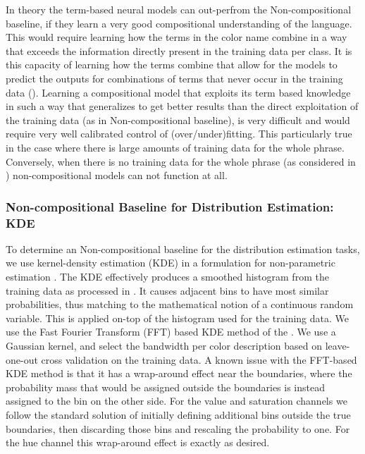 \documentclass[]{clv3}
\newcommand{\parencite}{\citep}
\newcommand{\textcite}{\citet}
\newcommand{\empmodel}{Non-compositional baseline}
\begin{document}
In theory the term-based neural models can out-perfrom the \empmodel{}, if they learn a very good compositional understanding of the language.
This would require learning how the terms in the color name combine in a way that exceeds the information directly present in the training data per class.
It is this capacity of learning how the terms combine that allow for the models to predict the outputs for combinations of terms that never occur in the training data ().
Learning a compositional model that exploits its term based knowledge in such a way  that generalizes to get better results than the direct exploitation of the training data (as in \empmodel{}), is very difficult and would require very well calibrated control of (over/under)fitting.
This particularly true in the case where there is large amounts of training data for the whole phrase.
Conversely, when there is no training data for the whole phrase (as considered in ) non-compositional models can not function at all.



\subsubsection{Non-compositional Baseline for Distribution Estimation: KDE}\label{sec:direct-histogram} \label{sec:kernel-density-based-smoothing}
To determine an \empmodel{} for the distribution estimation tasks,
we use kernel-density estimation (KDE) in a formulation for non-parametric estimation \parencite{silverman1986density} .
The KDE effectively produces a smoothed histogram from the training data as processed in .
It causes adjacent bins to have most similar probabilities, thus matching to the mathematical notion of a continuous random variable.
This is applied on-top of the histogram used for the training data.
We use the Fast Fourier Transform (FFT) based KDE method of the \textcite{silverman1982algorithm}.
We use a Gaussian kernel, and select the bandwidth per color description based on leave-one-out cross validation on the training data.
A known issue with the FFT-based KDE method is that it has a wrap-around effect near the boundaries, where the probability mass that would be assigned outside the boundaries is instead assigned to the bin on the other side.
For the value and saturation channels we follow the standard solution of initially defining additional bins outside the true boundaries, then discarding those bins and rescaling the probability to one.
For the hue channel this wrap-around effect is exactly as desired.
\end{document}
